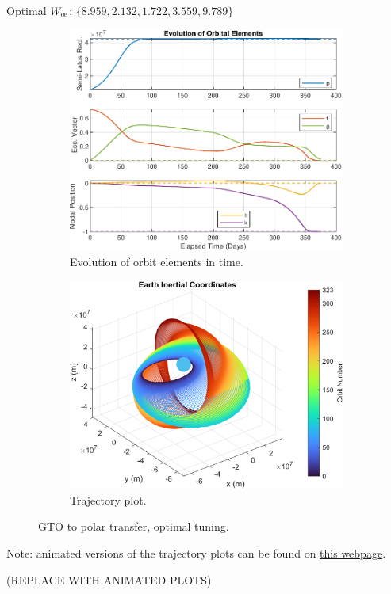 Optimal \(W_{\moe}\): \(\{8.959, 2.132, 1.722, 3.559, 9.789\}\)

\begin{figure}[H]
  \centering
  \begin{subfigure}[t]{0.49\textwidth}
    \includegraphics[width=\textwidth]{figures/oguri_optim/orbital_elements.pdf}
    \caption{Evolution of orbit elements in time.}
    \label{fig:oguri_optim_a}
  \end{subfigure}
  \begin{subfigure}[t]{0.49\textwidth}
    \includegraphics[width=\textwidth]{figures/oguri_optim/trajectory_plot.png}
    \caption{Trajectory plot.}
    \label{fig:oguri_optim_b}
  \end{subfigure}
  \caption{GTO to polar transfer, optimal tuning.}
  \label{fig:oguri_optim}
\end{figure}

{
\Large
Note: animated versions of the trajectory plots can be found on \href{https://github.com/itchono/SLyGA/wiki/Case-Outputs}{this webpage}.
}

(REPLACE WITH ANIMATED PLOTS)